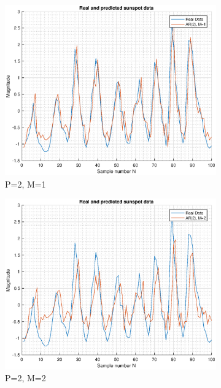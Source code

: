 \documentclass{article}
\begin{document}
\begin{figure}[h!]
\begin{subfigure}{0.24\textwidth}
\includegraphics[width = \textwidth]{ar_mod2_hor1}
\caption{P=2, M=1}
\label{fig:ar_mod2_hor1}
\end{subfigure}
\begin{subfigure}{0.24\textwidth}
\centering
\includegraphics[width = \textwidth]{ar_mod2_hor2}
\caption{P=2, M=2}
\label{fig:ar_mod2_hor2}
\end{subfigure}
\begin{subfigure}{0.24\textwidth}
\centering

\end{subfigure}
\end{figure}
\end{document}
